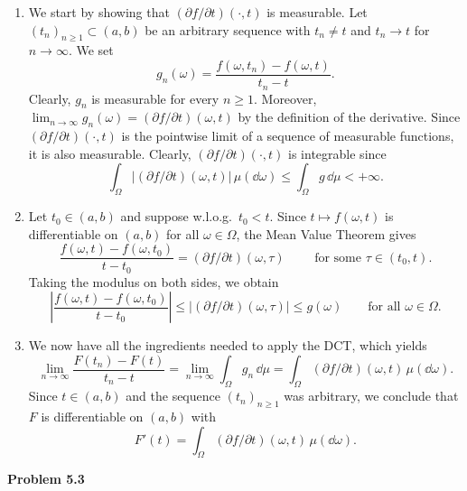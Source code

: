 \begin{enumerate}[label={(\arabic*)}]
	\item We start by showing that $(\partial f/\partial t)(\cdot,t)$ is measurable. Let $(t_n)_{n\ge 1}\subset(a,b)$ be an arbitrary sequence with $t_n\ne t$ and $t_n\to t$ for $n\to\infty$. We set
	\[
		g_n(\omega) = \frac{f(\omega,t_n)-f(\omega,t)}{t_n-t}.
	\]
	Clearly, $g_n$ is measurable for every $n\ge 1$. Moreover, $\lim_{n\to\infty} g_n(\omega) = (\partial f/\partial t)(\omega,t)$ by the definition of the derivative. Since $(\partial f/\partial t)(\cdot,t)$ is the pointwise limit of a sequence of measurable functions, it is also measurable. Clearly, $(\partial f/\partial t)(\cdot,t)$ is integrable since
	\[
		\int_\Omega |(\partial f/\partial t)(\omega,t)|\,\mu(\dd\omega) \le \int_\Omega g\,\dd\mu <+\infty.
	\]
	
	\item Let $t_0\in (a,b)$ and suppose w.l.o.g.\ $t_0<t$. Since $t\mapsto f(\omega,t)$ is differentiable on $(a,b)$ for all $\omega\in\Omega$, the Mean Value Theorem gives
	\[
		\frac{f(\omega,t)-f(\omega,t_0)}{t-t_0} = (\partial f/\partial t)(\omega,\tau)\qquad\text{	for some $\tau\in(t_0,t)$.}
	\]
	Taking the modulus on both sides, we obtain
	\[
		\left|\frac{f(\omega,t)-f(\omega,t_0)}{t-t_0}\right| \le |(\partial f/\partial t)(\omega,\tau)|\le g(\omega)\qquad\text{for all $\omega\in\Omega$}.
	\]
	\item We now have all the ingredients needed to apply the DCT, which yields
	\[
		\lim_{n\to\infty} \frac{F(t_n)-F(t)}{t_n-t} = \lim_{n\to\infty} \int_\Omega g_n\,\dd\mu = \int_\Omega (\partial f/\partial t)(\omega,t)\,\mu(\dd\omega).
	\]
	Since $t\in(a,b)$ and the sequence $(t_n)_{n\ge 1}$ was arbitrary, we conclude that $F$ is differentiable on $(a,b)$ with 
	\[
		F'(t) = \int_\Omega (\partial f/\partial t)(\omega,t)\,\mu(\dd\omega).
	\]
\end{enumerate}


\bigskip
\textbf{Problem 5.3}

